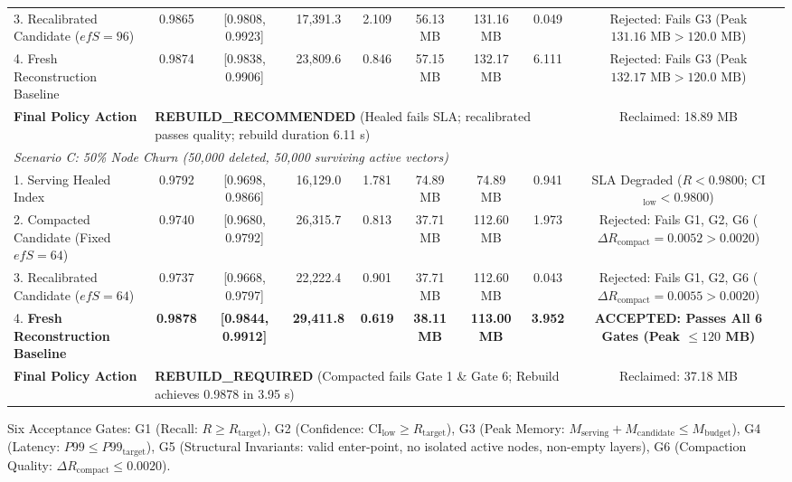 \begin{table}[t]
\begin{tabular}{lcccccccc}
3. Recalibrated Candidate ($efS=96$) & 0.9865 & [0.9808, 0.9923] & 17,391.3 & 2.109 & 56.13 MB & 131.16 MB & 0.049 & Rejected: Fails G3 (Peak $131.16\text{ MB} > 120.0\text{ MB}$) \\
4. Fresh Reconstruction Baseline & 0.9874 & [0.9838, 0.9906] & 23,809.6 & 0.846 & 57.15 MB & 132.17 MB & 6.111 & Rejected: Fails G3 (Peak $132.17\text{ MB} > 120.0\text{ MB}$) \\
\rowcolor{blue!5}
\textbf{Final Policy Action} & \multicolumn{7}{l}{\textbf{REBUILD\_RECOMMENDED} (Healed fails SLA; recalibrated passes quality; rebuild duration 6.11 s)} & Reclaimed: 18.89 MB \\
\midrule
\multicolumn{9}{l}{\textit{Scenario C: 50\% Node Churn (50,000 deleted, 50,000 surviving active vectors)}} \\
\midrule
1. Serving Healed Index & 0.9792 & [0.9698, 0.9866] & 16,129.0 & 1.781 & 74.89 MB & 74.89 MB & 0.941 & SLA Degraded ($R < 0.9800$; CI$_{\text{low}} < 0.9800$) \\
2. Compacted Candidate (Fixed $efS=64$) & 0.9740 & [0.9680, 0.9792] & 26,315.7 & 0.813 & 37.71 MB & 112.60 MB & 1.973 & Rejected: Fails G1, G2, G6 ($\Delta R_{\text{compact}} = 0.0052 > 0.0020$) \\
3. Recalibrated Candidate ($efS=64$) & 0.9737 & [0.9668, 0.9797] & 22,222.4 & 0.901 & 37.71 MB & 112.60 MB & 0.043 & Rejected: Fails G1, G2, G6 ($\Delta R_{\text{compact}} = 0.0055 > 0.0020$) \\
4. \textbf{Fresh Reconstruction Baseline} & \textbf{0.9878} & \textbf{[0.9844, 0.9912]} & \textbf{29,411.8} & \textbf{0.619} & \textbf{38.11 MB} & \textbf{113.00 MB} & \textbf{3.952} & \textbf{ACCEPTED: Passes All 6 Gates (Peak $\le 120$ MB)} \\
\rowcolor{blue!5}
\textbf{Final Policy Action} & \multicolumn{7}{l}{\textbf{REBUILD\_REQUIRED} (Compacted fails Gate 1 \& Gate 6; Rebuild achieves 0.9878 in 3.95 s)} & Reclaimed: 37.18 MB \\
\bottomrule
\end{tabular}
\begin{flushleft}
\scriptsize
Six Acceptance Gates: G1 (Recall: $R \ge R_{\text{target}}$), G2 (Confidence: $\text{CI}_{\text{low}} \ge R_{\text{target}}$), G3 (Peak Memory: $M_{\text{serving}} + M_{\text{candidate}} \le M_{\text{budget}}$), G4 (Latency: $P99 \le P99_{\text{target}}$), G5 (Structural Invariants: valid enter-point, no isolated active nodes, non-empty layers), G6 (Compaction Quality: $\Delta R_{\text{compact}} \le 0.0020$).
\end{flushleft}
\end{table}
